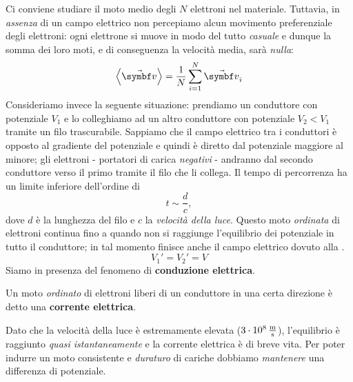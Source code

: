 Ci conviene studiare il moto medio degli $N$ elettroni nel materiale. Tuttavia, in \textit{assenza} di un campo elettrico non percepiamo alcun movimento preferenziale degli elettroni: ogni elettrone si muove in modo del tutto \textit{casuale} e dunque la somma dei loro moti, e di conseguenza la velocità media, sarà \textit{nulla}:
\begin{equation}
	\left<\vba{v}\right>=\frac{1}{N}\sum_{i=1}^{N}\vba{v}_i
\end{equation}
Consideriamo invece la seguente situazione: prendiamo un conduttore con potenziale $V_1$ e lo colleghiamo ad un altro conduttore con potenziale $V_2<V_1$ tramite un filo trascurabile. Sappiamo che il campo elettrico tra i conduttori è opposto al gradiente del potenziale e quindi è diretto dal potenziale maggiore al minore; gli elettroni - portatori di carica \textit{negativi} - andranno dal secondo conduttore verso il primo tramite il filo che li collega. Il tempo di percorrenza ha un limite inferiore dell'ordine di
\begin{equation*}
	t\sim\frac{d}{c},
\end{equation*}
dove $d$ è la lunghezza del filo e $c$ la \textit{velocità della luce}. Questo moto \textit{ordinata} di elettroni continua fino a quando non si raggiunge l'equilibrio dei potenziale in tutto il conduttore; in tal momento finisce anche il campo elettrico dovuto alla \ddp.
\begin{equation*}
	V_1'=V_2'=V
\end{equation*}
Siamo in presenza del fenomeno di \textbf{conduzione elettrica}.
\begin{define}
	Un moto \textit{ordinato} di elettroni liberi di un conduttore in una certa direzione è detto una \textbf{corrente elettrica}.
\end{define}
Dato che la velocità della luce è estremamente elevata ($\SI[per-mode = fraction,exponent-product=\ensuremath{\cdot}]{3d8}{\meter\per\second}$), l'equilibrio è raggiunto \textit{quasi istantaneamente} e la corrente elettrica è di breve vita. Per poter indurre un moto consistente e \textit{duraturo} di cariche dobbiamo \textit{mantenere} una differenza di potenziale.

